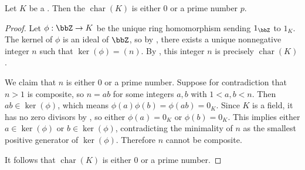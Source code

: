 \begin{proposition} \label{proposition:characteristic_of_a_field_is_zero_or_a_prime}
    Let $K$ be a .
    Then the  $\operatorname{char}(K)$ is either $0$ or a prime number $p$.
\end{proposition}
\begin{proof}
    Let $\phi : \bbZ \to K$ be the unique ring homomorphism sending $1_\bbZ$ to $1_K$. The kernel of $\phi$ is an ideal of $\bbZ$, so by , there exists a unique nonnegative integer $n$ such that $\operatorname{ker}(\phi) = (n)$. By , this integer $n$ is precisely $\operatorname{char}(K)$.

    We claim that $n$ is either $0$ or a prime number. Suppose for contradiction that $n > 1$ is composite, so $n = ab$ for some integers $a, b$ with $1 < a, b < n$. Then $ab \in \operatorname{ker}(\phi)$, which means $\phi(a)\phi(b) = \phi(ab) = 0_K$. Since $K$ is a field, it has no zero divisors by , so either $\phi(a) = 0_K$ or $\phi(b) = 0_K$. This implies either $a \in \operatorname{ker}(\phi)$ or $b \in \operatorname{ker}(\phi)$, contradicting the minimality of $n$ as the smallest positive generator of $\operatorname{ker}(\phi)$. Therefore $n$ cannot be composite.

    It follows that $\operatorname{char}(K)$ is either $0$ or a prime number.
\end{proof}

